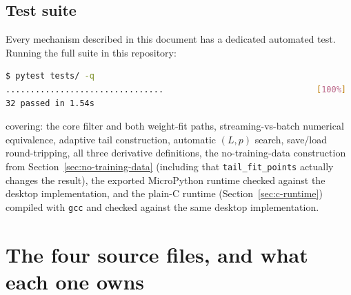 \documentclass[11pt]{article}
\begin{document}
\subsection{Test suite}
Every mechanism described in this document has a dedicated automated test. Running the full suite in this repository:
\begin{lstlisting}[language=bash]
$ pytest tests/ -q
................................                               [100%]
32 passed in 1.54s
\end{lstlisting}
covering: the core filter and both weight-fit paths, streaming-vs-batch numerical equivalence, adaptive tail construction, automatic $(L,p)$ search, save/load round-tripping, all three derivative definitions, the no-training-data construction from Section~\ref{sec:no-training-data} (including that \texttt{tail\_fit\_points} actually changes the result), the exported MicroPython runtime checked against the desktop implementation, and the plain-C runtime (Section~\ref{sec:c-runtime}) compiled with \texttt{gcc} and checked against the same desktop implementation.

\section{The four source files, and what each one owns}
\end{document}
